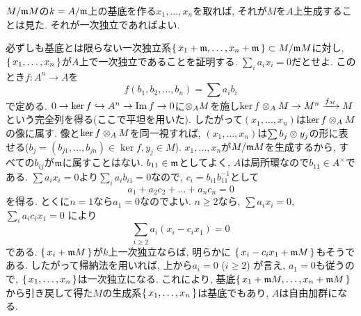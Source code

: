 \begin{probans}
$M/\mathfrak{m}M$の$k=A/\mathfrak{m}$上の基底を作る$x_1,\dots, x_n$を取れば, それが$M$を$A$上生成することは見た. それが一次独立であればよい. \par
必ずしも基底とは限らない一次独立系$\set{x_1+\mathfrak{m},\dots, x_n+\mathfrak{m}}\subset M/\mathfrak{m}M$に対し, $\set{x_1,\dots,x_n}$が$A$上で一次独立であることを証明する. $\sum_{i} a_i x_i = 0$だとせよ. このとき$f:A^n \to A$を
\[f(b_1,b_2,\dots, b_n) = \sum a_i b_i\]
で定める. $0\to \ker{f}\hookrightarrow A^n \to \mathrm{Im}\,f \to 0$に$\mathbin{\otimes}_{A}M$を施し$\ker{f}\mathbin{\otimes}_{A}M \to M^n \xrightarrow{f_M} M$という完全列を得る(ここで平坦を用いた). したがって$(x_1,\dots, x_n)$は$\ker{f} \mathbin{\otimes}_{A}M$の像に属す. 像と$\ker{f}\mathbin{\otimes}_{A}M$を同一視すれば, $(x_1,\dots, x_n)$は$\sum b_j \mathbin{\otimes} y_j$の形に表せる($b_j=(b_{j1},\dots, b_{jn})\in \ker{f}, y_j \in M$). $x_1,\dots, x_n$が$M/\mathfrak{m}M$を生成するから,  すべての$b_{ij}$が$\mathfrak{m}$に属すことはない. $b_{11}\in \mathfrak{m}$としてよく, $A$は局所環なので$b_{11}\in A^{\times}$である. $\sum a_i x_i = 0$より$\sum_{i}a_ib_{i1} = 0$なので, $c_i = b_{i1}b_{11}^{-1}$として
\[a_1 + a_2c_2 + \dots + a_nc_n = 0\]
を得る. とくに$n=1$なら$a_1=0$なのでよい. $n\geq 2$なら, $\sum a_{i}x_i = 0$, $\sum_{i} a_ic_ix_1 = 0$ により
\[\sum_{i\geq 2} a_i(x_i - c_ix_1 ) = 0\]
である. $\set{x_i+\mathfrak{m}M}$が$k$上一次独立ならば, 明らかに $\set{x_i - c_ix_1 + \mathfrak{m}M}$もそうである. したがって帰納法を用いれば, 上から$a_i = 0$ ($i\geq 2$) が言え, $a_1=0$も従うので, $\set{x_1,\dots, x_n}$は一次独立になる. これにより, 基底$\set{x_1+\mathfrak{m}M,\dots, x_n + \mathfrak{m}M}$から引き戻して得た$M$の生成系$\set{x_1,\dots, x_n}$は基底でもあり, $A$は自由加群になる.

\end{probans}
















\newpage
